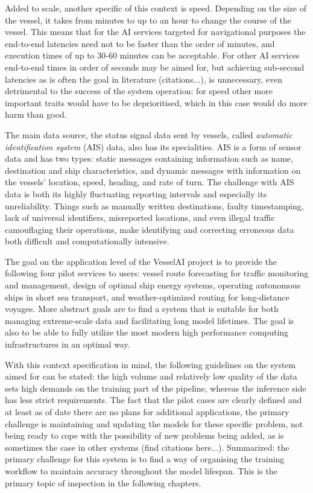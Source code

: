 Added to scale, another specific of this context is speed. Depending on the size of the vessel, it takes from minutes to up to an hour to change the course of the vessel. This means that for the AI services targeted for navigational purposes the end-to-end latencies need not to be faster than the order of minutes, and execution times of up to 30-60 minutes can be acceptable. For other AI services end-to-end times in order of seconds may be aimed for, but achieving sub-second latencies as is often the goal in literature (citations...), is unnecessary, even detrimental to the success of the system operation: for speed other more important traits would have to be deprioritised, which in this case would do more harm than good.

The main data source, the status signal data sent by vessels, called \textit{automatic identification system} (AIS) data, also has its specialities. AIS is a form of sensor data and has two types: static messages containing information such as name, destination and ship characteristics, and dynamic messages with information on the vessels' location, speed, heading, and rate of turn. The challenge with AIS data is both its highly fluctuating reporting intervals and especially its unreliability.  Things such as manually written destinations, faulty timestamping, lack of universal identifiers, misreported locations, and even illegal traffic camouflaging their operations, make identifying and correcting erroneous data both difficult and computationally intensive.

The goal on the application level of the VesselAI project is to provide the following four pilot services to users: vessel route forecasting for traffic monitoring and management, design of optimal ship energy systems, operating autonomous ships in short sea transport, and weather-optimized routing for long-distance voyages. More abstract goals are to find a system that is suitable for both managing extreme-scale data and facilitating long model lifetimes. The goal is also to be able to fully utilize the most modern high performance computing infrastructures in an optimal way.

With this context specification in mind, the following guidelines on the system aimed for can be stated: the high volume and relatively low quality of the data sets high demands on the training part of the pipeline, whereas the inference side has less strict requirements. The fact that the pilot cases are clearly defined and at least as of date there are no plans for additional applications, the primary challenge is maintaining and updating the models for these specific problem, not being ready to cope with the possibility of new problems being added, as is sometimes the case in other systems (find citations here...).  Summarized: the primary challenge for this system is to find a way of organising the training workflow to maintain accuracy throughout the model lifespan. This is the primary topic of inspection in the following chapters.

